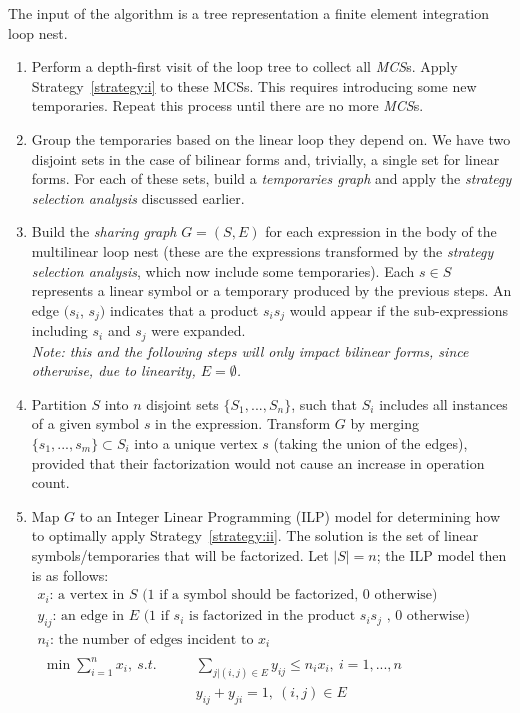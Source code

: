 \begin{Algo}
\label{algo:sharing-elimination}
\normalfont 
The input of the algorithm is a tree representation a finite element integration loop nest.
\begin{enumerate}
\item Perform a depth-first visit of the loop tree to collect all {\em MCS}s. Apply Strategy~\ref{strategy:i} to these MCSs. This requires introducing some new temporaries. Repeat this process until there are no more {\em MCS}s.

\item Group the temporaries based on the linear loop they depend on. We have two disjoint sets in the case of bilinear forms and, trivially, a single set for linear forms. For each of these sets, build a {\em temporaries graph} and apply the {\em strategy selection analysis} discussed earlier.

\item Build the {\em sharing graph} $G = (S, E)$ for each expression in the body of the multilinear loop nest (these are the expressions transformed by the {\em strategy selection analysis}, which now include some temporaries). Each $s \in S$ represents a linear symbol or a temporary produced by the previous steps. An edge $(s_i$, $s_j)$ indicates that a product $s_i s_j$ would appear if the sub-expressions including $s_i$ and $s_j$ were expanded.\\
\textit{Note: this and the following steps will only impact bilinear forms, since otherwise, due to linearity, $E = \emptyset$.}

\item Partition $S$ into $n$ disjoint sets $\lbrace S_1, ..., S_n\rbrace$, such that $S_i$ includes all instances of a given symbol $s$ in the expression. Transform $G$ by merging $\lbrace s_1, ..., s_m \rbrace \subset S_i$ into a unique vertex $s$ (taking the union of the edges), provided that their factorization would not cause an increase in operation count.

\item Map $G$ to an Integer Linear Programming (ILP) model for determining how to optimally apply Strategy~\ref{strategy:ii}. The solution is the set of linear symbols/temporaries that will be factorized. Let $|S| = n$; the ILP model then is as follows:
\begin{gather*}
x_i \text{: a vertex in } S \text{ (1 if a symbol should be factorized, 0 otherwise)}\\
y_{ij} \text{: an edge in } E \text{ (1 if } s_i \text{ is factorized in the product } s_i s_j \text{ , 0 otherwise)}\\
n_i \text{: the number of edges incident to } x_i \\
\begin{align*}
\min \sum_{i=1}^{n} x_i,\ s.t. ~~~~~~~~~&\sum_{j|(i,j) \in E} y_{ij} \leq n_i x_i,\ i = 1, ..., n \\
& y_{ij} + y_{ji} = 1,\ (i, j) \in E
\end{align*}
\phantom{\hspace{6cm}}
\end{gather*}



\end{enumerate}
\end{Algo}
